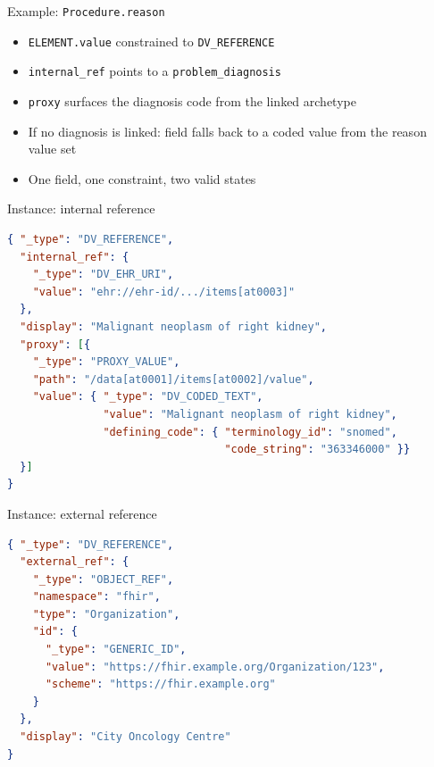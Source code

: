 \documentclass[10pt]{beamer}
\begin{document}
\begin{frame}{Example: \texttt{Procedure.reason}}
  \begin{itemize}
    \item \texttt{ELEMENT.value} constrained to \texttt{DV\_REFERENCE}
    \item \texttt{internal\_ref} points to a \texttt{problem\_diagnosis}
    \item \texttt{proxy} surfaces the diagnosis code from the linked archetype
    \item If no diagnosis is linked: field falls back to a coded value from the reason value set
    \item One field, one constraint, two valid states
  \end{itemize}
\end{frame}

\begin{frame}[fragile]{Instance: internal reference}
\begin{lstlisting}[language=json]
{ "_type": "DV_REFERENCE",
  "internal_ref": {
    "_type": "DV_EHR_URI",
    "value": "ehr://ehr-id/.../items[at0003]"
  },
  "display": "Malignant neoplasm of right kidney",
  "proxy": [{
    "_type": "PROXY_VALUE",
    "path": "/data[at0001]/items[at0002]/value",
    "value": { "_type": "DV_CODED_TEXT",
               "value": "Malignant neoplasm of right kidney",
               "defining_code": { "terminology_id": "snomed",
                                  "code_string": "363346000" }}
  }]
}
\end{lstlisting}
\end{frame}

\begin{frame}[fragile]{Instance: external reference}
\begin{lstlisting}[language=json]
{ "_type": "DV_REFERENCE",
  "external_ref": {
    "_type": "OBJECT_REF",
    "namespace": "fhir",
    "type": "Organization",
    "id": {
      "_type": "GENERIC_ID",
      "value": "https://fhir.example.org/Organization/123",
      "scheme": "https://fhir.example.org"
    }
  },
  "display": "City Oncology Centre"
}
\end{lstlisting}
\end{frame}
\end{document}
